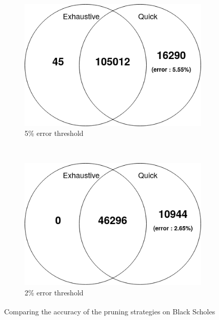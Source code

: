                 \begin{figure}[h!]
                    \begin{subfigure}{0.49\textwidth}
                        \centering
                        \includegraphics[width=1.0\textwidth]{Figures/results/qor-venn-5}
                        \caption{5\% error threshold}
                        \label{ch.expe:sec.strategies:ssec.bs:fig.venn:sfig.5}
                    \end{subfigure}
                    ~
                    \begin{subfigure}{0.49\textwidth}
                        \centering
                        \includegraphics[width=1.0\textwidth]{Figures/results/qor-venn-2}
                        \caption{2\% error threshold}
                        \label{ch.expe:sec.strategies:ssec.bs:fig.venn:sfig.2}
                    \end{subfigure}
                    \caption[Comparing the accuracy of the pruning strategies]{Comparing the accuracy of the pruning strategies on Black Scholes\textsuperscript{\styx}}
                    \label{ch.expe:sec.strategies:ssec.bs:fig.venn}
                \end{figure}


